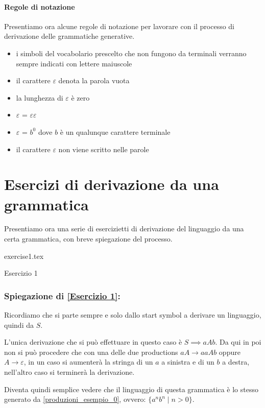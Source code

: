 \documentclass[class=book, crop=false, oneside, 12pt]{standalone}
\begin{document}
\paragraph{Regole di notazione}
Presentiamo ora alcune regole di notazione per lavorare con il processo di derivazione delle grammatiche generative.
\begin{itemize}
    \item i simboli del vocabolario prescelto che non fungono da terminali verranno sempre indicati con lettere maiuscole
    \item il carattere \(\varepsilon\) denota la parola vuota
    \item la lunghezza di \(\varepsilon\) è zero
    \item \(\varepsilon\) = \(\varepsilon\)\(\varepsilon\)
    \item \(\varepsilon\) =  \(b^0\) dove \(b\) è un qualunque carattere terminale
    \item il carattere \(\varepsilon\) non viene scritto nelle parole
\end{itemize}

\section{Esercizi di derivazione da una grammatica}
Presentiamo ora una serie di esercizietti di derivazione del linguaggio da una certa grammatica, con breve spiegazione del processo.

\begin{table}[H]
	\centering
	{exercise1.tex}
    \caption{Esercizio 1}
    \label{Esercizio 1}
\end{table}
\subsubsection*{Spiegazione di \ref{Esercizio 1}:}
Ricordiamo che si parte sempre e solo dallo start symbol a derivare un linguaggio, quindi da \(S\).

L'unica derivazione che si può effettuare in questo caso è \(S \implies aAb\).
Da qui in poi non si può procedere che con una delle due productions \(aA \to aaAb\) oppure \(A \to \varepsilon\), in un caso si aumenterà la stringa di un \(a\) a sinistra e di un \(b\) a destra, nell'altro caso si terminerà la derivazione.

Diventa quindi semplice vedere che il linguaggio di questa grammatica è lo stesso generato da \ref{produzioni_esempio_0}, ovvero: \(\{a^n b^n \mid n>0\}\).
\end{document}
